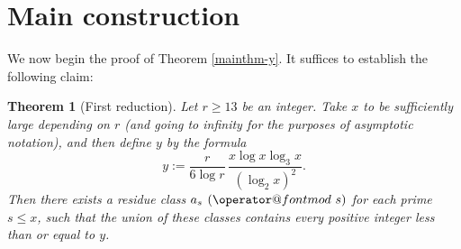 \documentclass[12pt]{amsart}
\makeatletter
\numberwithin{equation}{section}  %
\theoremstyle{remark}
\theoremstyle{plain}
\newtheorem{thm}{Theorem}
\numberwithin{equation}{section}
\renewcommand{\pmod}[1]{\allowbreak\mkern7mu({\operator@font mod}\,\,#1)}
\newcommand{\be}{\begin{equation}}
\newcommand{\ee}{\end{equation}}
\renewcommand{\le}{\leqslant}
\renewcommand{\leq}{\leqslant}
\renewcommand{\geq}{\geqslant}
\renewcommand{\(}{\left(}
\renewcommand{\)}{\right)}
\newcommand{\pfrac}[2]{\left(\frac{#1}{#2}\right)}  %
\newcommand{\asym}{\sim}   %
\newcommand{\PP}{\mathcal{P}}
\newcommand{\QQ}{\mathcal{Q}}
\makeatother
\begin{document}
\begin{comment}
\begin{proof}
By Lemma \ref{second}, there is a subset $\QQ$ of the primes from $(x/4,y]$
such that
\begin{equation}
\label{cardQ}
|\QQ| \asym \frac{y}{\log x}
\end{equation}
such that for all $q\in\QQ$ and $i\in \{ 0,\dots,r-1\}$ we have
\begin{equation}
\label{cardP(q)}
|\{p \in \PP : \; q-ir!p\in\QQ(p)\}| \asym \alpha_r\frac{x}{2(\log x)^r}.
\end{equation}
Write
\[ \Sigma := \sum_{i=0}^{r-1}\sum_{q\in(x/4,y]}\big(|\{ p \in \PP : \;q-ir!p\in\QQ(p)\}|
-|\PP_0(q,i)|\big).\]
Then $\Sigma$ counts the triples $(i,p,q)$ for which $p \in P$, $q \in (x/4,y]$, $q- ir! p \in Q(p)$ but for which either $p \notin P_0$ or $q - ir! p \notin Q_0(p)$. Consequently we have the estimate
\[ \Sigma \leq r |\PP \setminus \PP_0| \max_{p \in \PP} |\QQ(p)| + r \sum_{p \in \PP} |\QQ(p) \setminus \QQ_0(p)|.\]

By~(\ref{cardP}) and Lemma~\ref{sieve1} we have
$$|\PP \setminus \PP_0| \max_{p \in \PP}|\QQ(p)|=
o\pfrac{xy}{(\log x)^{r+1}},$$
and by \eqref{compareQ(p)_Q0(p)},
$$\sum_{p\in(x/2,x]}|\QQ(p)\setminus\QQ_0(p)| \ll_r
\frac{xy}{(\log x)^{r+2}}.$$
It follows that 
$$\Sigma=o\left(\frac{xy}{(\log x)^{r+1}}\right).$$ Therefore for all but $o(y/\log x)$ exceptional values of $q \in Q$ we have
\[ \sum_{i = 0}^{r-1} \big(|\{ p \in \PP : \;q-ir!p\in\QQ(p)\}|
-|\PP_0(q,i)|\big) = o\pfrac{x}{(\log x)^r}.\]
Taking $Q_0$ to consist of all the non-exceptional values of $q$ gives the result.
\end{proof}
Finally, for future reference, we observe that for $i<i'$ the condition
$q-i'r!p\in\QQ_0(p)$ implies $p\not\in\PP_0(q,i)$. Hence,
\begin{equation}\label{nonintersec}
\PP_0(q,i)\cap\PP_0(q,i')=\emptyset \qquad (i\ne i').
\end{equation}
\end{comment}

%
\section{Main construction}
%

We now begin the proof of Theorem \ref{mainthm-y}.  It suffices to establish the following claim:

\begin{thm}[First reduction]\label{first-red} Let $r \geq 13$ be an integer.  Take $x$ to be sufficiently large depending on $r$ (and going to infinity for the purposes of asymptotic notation), and then define $y$ by the formula
\be\label{ydef}
y := \frac{r}{6\log r}\, \frac{x\log x\log_3 x}{(\log_2 x)^2}.
\ee
Then there exists a residue class $a_s \pmod s$ for each
prime $s\le x$, such that the union of these classes
contains every positive integer less than or equal to $y$.
\end{thm}
\end{document}
